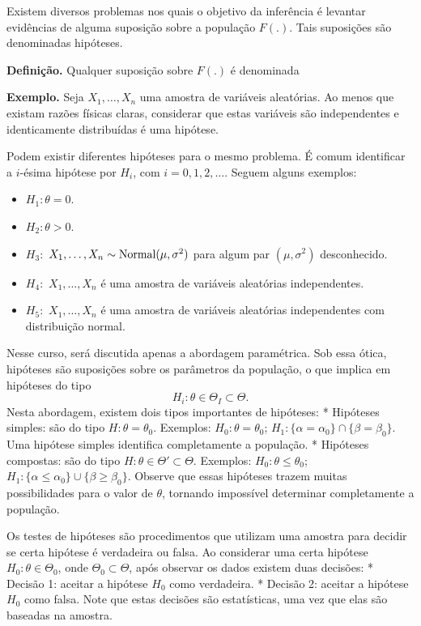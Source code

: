\documentclass[
  letterpaper,
  DIV=11,
  numbers=noendperiod]{scrartcl}
\providecommand{\tightlist}{%
  \setlength{\itemsep}{0pt}\setlength{\parskip}{0pt}}\usepackage{longtable,booktabs,array}
\begin{document}
Existem diversos problemas nos quais o objetivo da inferência é levantar
evidências de alguma suposição sobre a população \(F(.)\). Tais
suposições são denominadas hipóteses.

\textbf{Definição.} Qualquer suposição sobre \(F(.)\) é denominada

\textbf{Exemplo.} Seja \(X_1,\ldots,X_n\) uma amostra de variáveis
aleatórias. Ao menos que existam razões físicas claras, considerar que
estas variáveis são independentes e identicamente distribuídas é uma
hipótese.

Podem existir diferentes hipóteses para o mesmo problema. É comum
identificar a \(i\)-ésima hipótese por \(H_i\), com \(i=0,1,2,\ldots\).
Seguem alguns exemplos:

\begin{itemize}
\tightlist
\item
  \(H_1:\theta=0\).
\item
  \(H_2:\theta>0\).
\item
  \(H_3:\) \(X_1,\ldots,X_n\sim\hbox{Normal}(\mu,\sigma^2)\) para algum
  par \((\mu,\sigma^2)\) desconhecido.
\item
  \(H_4:\) \(X_1,\ldots,X_n\) é uma amostra de variáveis aleatórias
  independentes.
\item
  \(H_5:\) \(X_1,\ldots,X_n\) é uma amostra de variáveis aleatórias
  independentes com distribuição normal.
\end{itemize}

Nesse curso, será discutida apenas a abordagem paramétrica. Sob essa
ótica, hipóteses são suposições sobre os parâmetros da população, o que
implica em hipóteses do tipo \[H_i:\theta\in \Theta_I\subset\Theta.\]
Nesta abordagem, existem dois tipos importantes de hipóteses: *
Hipóteses simples: são do tipo \(H:\theta=\theta_0\). Exemplos:
\(H_0:\theta=\theta_0\);
\(H_1:\{\alpha=\alpha_0\}\cap\{\beta=\beta_0\}\). Uma hipótese simples
identifica completamente a população. * Hipóteses compostas: são do tipo
\(H:\theta\in \Theta'\subset \Theta\). Exemplos:
\(H_0:\theta\leq \theta_0\);
\(H_1:\{\alpha\leq\alpha_0\}\cup\{\beta\geq\beta_0\}\). Observe que
essas hipóteses trazem muitas possibilidades para o valor de \(\theta\),
tornando impossível determinar completamente a população.

Os testes de hipóteses são procedimentos que utilizam uma amostra para
decidir se certa hipótese é verdadeira ou falsa. Ao considerar uma certa
hipótese \(H_0:\theta\in\Theta_0\), onde \(\Theta_0\subset \Theta\),
após observar os dados existem duas decisões: * Decisão 1: aceitar a
hipótese \(H_0\) como verdadeira. * Decisão 2: aceitar a hipótese
\(H_0\) como falsa. Note que estas decisões são estatísticas, uma vez
que elas são baseadas na amostra.
\end{document}
